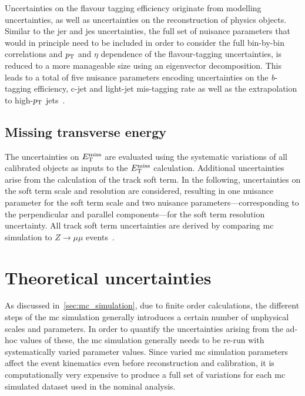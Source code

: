  Uncertainties on the flavour tagging efficiency originate from \eg modelling uncertainties, as well as uncertainties on the reconstruction of physics objects. Similar to the \gls{jer} and \gls{jes} uncertainties, the full set of nuisance parameters that would in principle need to be included in order to consider the full bin-by-bin correlations and $p_{\textrm{T}}$ and $\eta$ dependence of the flavour-tagging uncertainties, is reduced to a more manageable size using an eigenvector decomposition. This leads to a total of five nuisance parameters encoding uncertainties on the \textit{b}-tagging efficiency, c-jet and light-jet mis-tagging rate as well as the extrapolation to high-$p_{\textrm{T}}$ jets~\cite{FTAG-2018-01, PERF-2016-05}.  
 
\subsection{Missing transverse energy}

The uncertainties on $E_{\textrm{T}}^{\textrm{miss}}$ are evaluated using the systematic variations of all calibrated objects as inputs to the $E_{\textrm{T}}^{\textrm{miss}}$ calculation. Additional uncertainties arise from the calculation of the track soft term. In the following, uncertainties on the soft term scale and resolution are considered, resulting in one nuisance parameter for the soft term scale and two nuisance parameters---corresponding to the perpendicular and parallel components---for the soft term resolution uncertainty. All track soft term uncertainties are derived by comparing \gls{mc} simulation to $Z\rightarrow\mu\mu$ events~\cite{PERF-2016-07}. 

\section{Theoretical uncertainties}

As discussed in~\cref{sec:mc_simulation}, due to finite order calculations, the different steps of the \gls{mc} simulation generally introduces a certain number of unphysical scales and parameters. In order to quantify the uncertainties arising from the ad-hoc values of these, the \gls{mc} simulation generally needs to be re-run with systematically varied parameter values. Since varied \gls{mc} simulation parameters affect the event kinematics even before reconstruction and calibration, it is computationally very expensive to produce a full set of variations for each \gls{mc} simulated dataset used in the nominal analysis.

